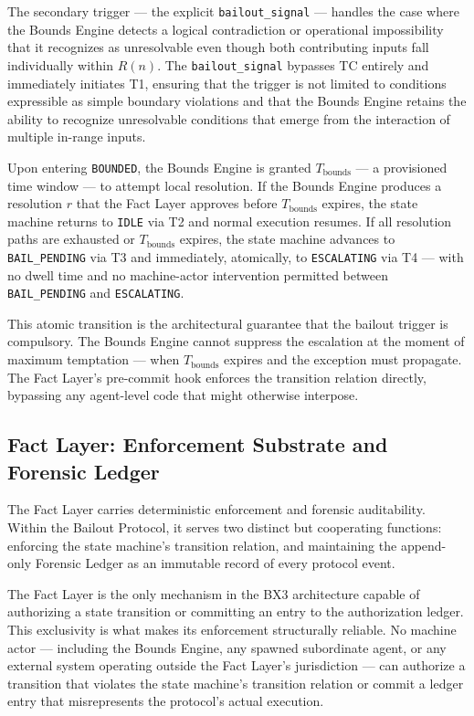 The secondary trigger --- the explicit \texttt{bailout\_signal} --- handles the case where the Bounds Engine detects a logical contradiction or operational impossibility that it recognizes as unresolvable even though both contributing inputs fall individually within $R(n)$. The \texttt{bailout\_signal} bypasses TC entirely and immediately initiates T1, ensuring that the trigger is not limited to conditions expressible as simple boundary violations and that the Bounds Engine retains the ability to recognize unresolvable conditions that emerge from the interaction of multiple in-range inputs.

Upon entering \texttt{BOUNDED}, the Bounds Engine is granted $T_{\text{bounds}}$ --- a provisioned time window --- to attempt local resolution. If the Bounds Engine produces a resolution $r$ that the Fact Layer approves before $T_{\text{bounds}}$ expires, the state machine returns to \texttt{IDLE} via T2 and normal execution resumes. If all resolution paths are exhausted or $T_{\text{bounds}}$ expires, the state machine advances to \texttt{BAIL\_PENDING} via T3 and immediately, atomically, to \texttt{ESCALATING} via T4 --- with no dwell time and no machine-actor intervention permitted between \texttt{BAIL\_PENDING} and \texttt{ESCALATING}.

This atomic transition is the architectural guarantee that the bailout trigger is compulsory. The Bounds Engine cannot suppress the escalation at the moment of maximum temptation --- when $T_{\text{bounds}}$ expires and the exception must propagate. The Fact Layer's pre-commit hook enforces the transition relation directly, bypassing any agent-level code that might otherwise interpose.

\subsection{Fact Layer: Enforcement Substrate and Forensic Ledger}\label{sec:fact-layer}

The Fact Layer carries deterministic enforcement and forensic auditability. Within the Bailout Protocol, it serves two distinct but cooperating functions: enforcing the state machine's transition relation, and maintaining the append-only Forensic Ledger as an immutable record of every protocol event.

The Fact Layer is the only mechanism in the BX3 architecture capable of authorizing a state transition or committing an entry to the authorization ledger. This exclusivity is what makes its enforcement structurally reliable. No machine actor --- including the Bounds Engine, any spawned subordinate agent, or any external system operating outside the Fact Layer's jurisdiction --- can authorize a transition that violates the state machine's transition relation or commit a ledger entry that misrepresents the protocol's actual execution.

